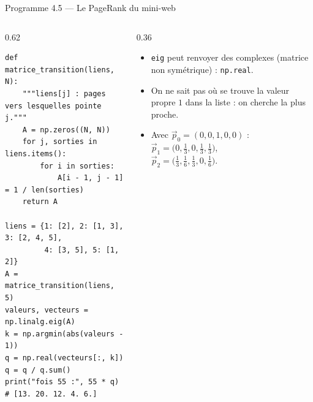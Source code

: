 \begin{frame}[fragile]{Programme 4.5 --- Le PageRank du mini-web}
  \begin{columns}[T]
    \begin{column}{0.62\textwidth}
\begin{lstlisting}
def matrice_transition(liens, N):
    """liens[j] : pages vers lesquelles pointe j."""
    A = np.zeros((N, N))
    for j, sorties in liens.items():
        for i in sorties:
            A[i - 1, j - 1] = 1 / len(sorties)
    return A

liens = {1: [2], 2: [1, 3], 3: [2, 4, 5],
         4: [3, 5], 5: [1, 2]}
A = matrice_transition(liens, 5)
valeurs, vecteurs = np.linalg.eig(A)
k = np.argmin(abs(valeurs - 1))
q = np.real(vecteurs[:, k])
q = q / q.sum()
print("fois 55 :", 55 * q)  # [13. 20. 12. 4. 6.]
\end{lstlisting}
    \end{column}
    \begin{column}{0.36\textwidth}
      \small
      \begin{itemize}
        \item \texttt{eig} peut renvoyer des complexes (matrice non
          symétrique) : \texttt{np.real}.
        \item On ne sait pas où se trouve la valeur propre $1$ dans la
          liste : on cherche la plus proche.
        \item Avec $\vec p_0=(0,0,1,0,0)$ :\\
          $\vec p_1=\big(0,\tfrac13,0,\tfrac13,\tfrac13\big)$,\\
          $\vec p_2=\big(\tfrac13,\tfrac16,\tfrac13,0,\tfrac16\big)$.
      \end{itemize}
    \end{column}
  \end{columns}
\end{frame}

